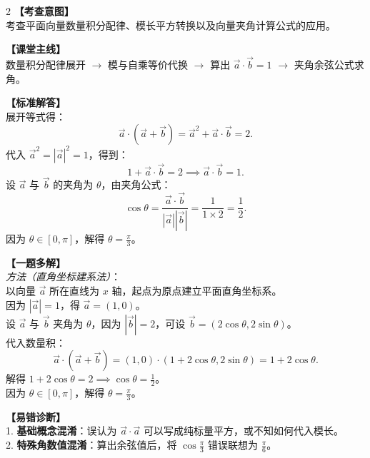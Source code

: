 \documentclass[11pt,a4paper]{ctexart}
\begin{document}
\vspace{0.8em}
\par{}
\vspace{0.8em}

\newpage


\qThreeStem
\qThreeOptions

\vspace{0.8em}

\begin{paracol}{2}
  \textbf{【考查意图】}\\
  考查平面向量数量积分配律、模长平方转换以及向量夹角计算公式的应用。
  
  \textbf{【课堂主线】}\\
  数量积分配律展开 $\to$ 模与自乘等价代换 $\to$ 算出 $\vec{a}\cdot\vec{b} = 1$ $\to$ 夹角余弦公式求角。
  
  \textbf{【标准解答】}\\
  展开等式得：
  \[
  \vec{a} \cdot (\vec{a} + \vec{b}) = \vec{a}^2 + \vec{a} \cdot \vec{b} = 2.
  \]
  代入 $\vec{a}^2 = |\vec{a}|^2 = 1$，得到：
  \[
  1 + \vec{a} \cdot \vec{b} = 2 \implies \vec{a} \cdot \vec{b} = 1.
  \]
  设 $\vec{a}$ 与 $\vec{b}$ 的夹角为 $\theta$，由夹角公式：
  \[
  \cos\theta = \frac{\vec{a} \cdot \vec{b}}{|\vec{a}||\vec{b}|} = \frac{1}{1 \times 2} = \frac{1}{2}.
  \]
  因为 $\theta \in [0, \pi]$，解得 $\theta = \frac{\pi}{3}$。
  
  \textbf{【一题多解】}\\
  \textit{方法（直角坐标建系法）}：\\
  以向量 $\vec{a}$ 所在直线为 $x$ 轴，起点为原点建立平面直角坐标系。\\
  因为 $|\vec{a}| = 1$，得 $\vec{a} = (1, 0)$。\\
  设 $\vec{a}$ 与 $\vec{b}$ 夹角为 $\theta$，因为 $|\vec{b}| = 2$，可设 $\vec{b} = (2\cos\theta, 2\sin\theta)$。\\
  代入数量积：
  \[
  \vec{a} \cdot (\vec{a} + \vec{b}) = (1, 0) \cdot (1 + 2\cos\theta, 2\sin\theta) = 1 + 2\cos\theta.
  \]
  解得 $1 + 2\cos\theta = 2 \implies \cos\theta = \frac{1}{2}$。\\
  因为 $\theta \in [0, \pi]$，解得 $\theta = \frac{\pi}{3}$。

  \switchcolumn
  \textbf{【易错诊断】}\\
  1. \textbf{基础概念混淆}：误认为 $\vec{a}\cdot\vec{a}$ 可以写成纯标量平方，或不知如何代入模长。\\
  2. \textbf{特殊角数值混淆}：算出余弦值后，将 $\cos\frac{\pi}{3}$ 错误联想为 $\frac{\pi}{6}$。
  

\end{paracol}
\end{document}
